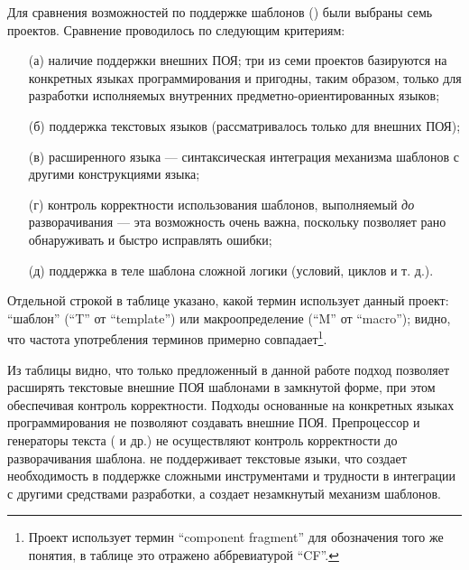 Для сравнения возможностей по поддержке шаблонов () были выбраны семь проектов. Сравнение проводилось по следующим критериям:
\begin{itemize}
	\item[(а)] наличие поддержки внешних ПОЯ; три из семи проектов базируются на конкретных языках программирования и пригодны, таким образом, только для разработки исполняемых внутренних предметно-ориентированных языков;
	\item[(б)] поддержка текстовых языков (рассматривалось только для внешних ПОЯ);
	\item[(в)]  расширенного языка --- синтаксическая интеграция механизма шаблонов с другими конструкциями языка;
	\item[(г)] контроль корректности использования шаблонов, выполняемый \emph{до} разворачивания --- эта возможность очень важна, поскольку позволяет рано обнаруживать и быстро исправлять ошибки;
	\item[(д)] поддержка в теле шаблона сложной логики (условий, циклов и т. д.).
\end{itemize}	
Отдельной строкой в таблице указано, какой термин использует данный проект: ``шаблон'' (``T'' от ``template'') или макроопределение (``M'' от ``macro''); видно, что частота употребления терминов примерно совпадает\footnote{Проект  использует термин ``component fragment'' для обозначения того же понятия, в таблице это отражено аббревиатурой ``CF''.}.
	
Из таблицы видно, что только предложенный в данной работе подход позволяет расширять текстовые внешние ПОЯ шаблонами в замкнутой форме, при этом обеспечивая контроль корректности. Подходы основанные на конкретных языках программирования не позволяют создавать внешние ПОЯ. Препроцессор  и генераторы текста ( и др.) не осуществляют контроль корректности до разворачивания шаблона.  не поддерживает текстовые языки, что создает необходимость в поддержке сложными инструментами и трудности в интеграции с другими средствами разработки, а  создает незамкнутый механизм шаблонов.

